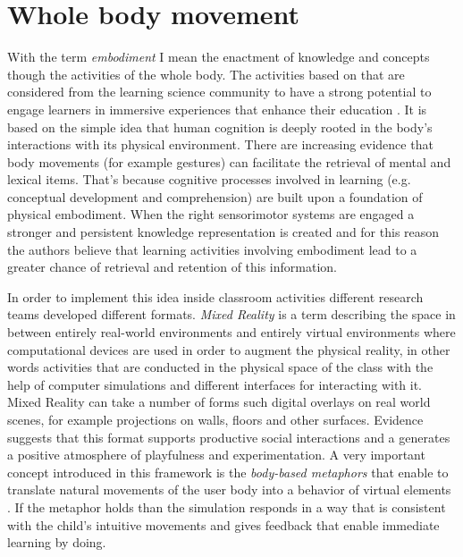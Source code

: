 \section{Whole body movement}
With the term \textit{embodiment} I mean the enactment of knowledge and concepts though the activities of the whole body. The activities based on that are considered from the learning science community to have a strong potential to engage learners in immersive experiences that enhance their education \cite{lindgren:emboldened}. It is based on the simple idea that human cognition is deeply rooted in the body’s interactions with its physical environment. There are increasing evidence that body movements (for example gestures) can facilitate the retrieval of mental and lexical items. That’s because cognitive processes involved in learning (e.g. conceptual development and comprehension) are built upon a foundation of physical embodiment. When the right sensorimotor systems are engaged a stronger and persistent knowledge representation is created \cite{lindgren:emboldened} and for this reason the authors believe that learning activities involving embodiment lead to a greater chance of retrieval and retention of this information.

In order to implement this idea inside classroom activities different research teams developed different formats. \textit{Mixed Reality} is a term describing the space in between entirely real-world environments and entirely virtual environments  \cite{milgram:taxonomy} where computational devices are used in order to augment the physical reality, in other words activities that are conducted in the physical space of the class with the help of computer simulations and different interfaces for interacting with it. Mixed Reality can take a number of forms such digital overlays on real world scenes, for example projections on walls, floors and other surfaces. Evidence suggests that this format supports productive social interactions and a generates a positive atmosphere of playfulness and experimentation. A very important concept introduced in this framework is the \textit{body-based metaphors} that enable to translate natural movements of the user body into a behavior of virtual elements \cite{lindgren:supporting}. If the metaphor holds than the simulation responds in a way that is consistent with the child’s intuitive movements and gives feedback that enable immediate learning by doing.

